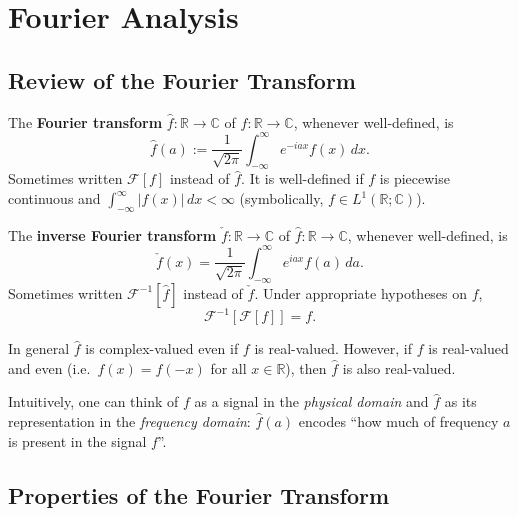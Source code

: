 
\newpage

\chapter{Fourier Analysis}\label{chap:fourier_analysis}
\section{Review of the Fourier Transform}

\begin{definition}
The \textbf{Fourier transform} $\hat{f} : \mathbb{R} \to \mathbb{C}$ of $f : \mathbb{R} \to \mathbb{C}$, whenever well-defined, is
\[
\hat{f}(a) := \frac{1}{\sqrt{2\pi}} \int_{-\infty}^{\infty} e^{-iax} f(x)\, dx.
\]
Sometimes written $\mathcal{F}[f]$ instead of $\hat{f}$. It is well-defined if $f$ is piecewise continuous and $\int_{-\infty}^{\infty} |f(x)|\, dx < \infty$ (symbolically, $f \in L^1(\mathbb{R};\mathbb{C})$).
\end{definition}

\begin{definition}
The \textbf{inverse Fourier transform} $\check{f} : \mathbb{R} \to \mathbb{C}$ of $\hat{f} : \mathbb{R} \to \mathbb{C}$, whenever well-defined, is
\[
\check{f}(x) = \frac{1}{\sqrt{2\pi}} \int_{-\infty}^{\infty} e^{iax} f(a)\, da.
\]
Sometimes written $\mathcal{F}^{-1}[\hat{f}]$ instead of $\check{f}$. Under appropriate hypotheses on $f$,
\[
\mathcal{F}^{-1}[\mathcal{F}[f]] = f.
\]
\end{definition}

\begin{remark}
In general $\hat{f}$ is complex-valued even if $f$ is real-valued. However, if $f$ is real-valued and even (i.e.\ $f(x) = f(-x)$ for all $x \in \mathbb{R}$), then $\hat{f}$ is also real-valued.

Intuitively, one can think of $f$ as a signal in the \emph{physical domain} and $\hat{f}$ as its representation in the \emph{frequency domain}: $\hat{f}(a)$ encodes ``how much of frequency $a$ is present in the signal $f$''.
\end{remark}

\section{Properties of the Fourier Transform}

